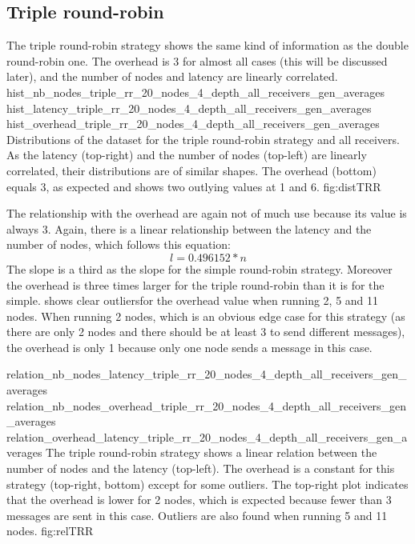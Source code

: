 \FloatBarrier
\subsection{Triple round-robin}
The triple round-robin strategy shows  the same kind of information as the
double round-robin one. The overhead is 3 for almost all cases (this will be
discussed later), and the number of nodes and latency are linearly correlated.
\triplefigure
    {hist_nb_nodes_triple_rr_20_nodes_4_depth_all_receivers_gen_averages}
    {hist_latency_triple_rr_20_nodes_4_depth_all_receivers_gen_averages}
    {hist_overhead_triple_rr_20_nodes_4_depth_all_receivers_gen_averages}
    {Distributions of the dataset for the triple round-robin strategy and all
    receivers. As the latency (top-right) and the number of nodes (top-left) are
    linearly correlated, their distributions are of similar shapes. The
    overhead (bottom) equals 3, as expected and shows two outlying values at 1
    and 6.}
    {fig:distTRR}

The relationship with the overhead are again not of much use because its value
is always 3. Again, there is a linear relationship between the latency and the
number of nodes, which follows this equation:
    \[l = 0.496152 * n\]
The slope is a third as the slope for the simple round-robin strategy. Moreover
the overhead is three times larger for the triple round-robin than it is for the
simple.
 shows clear outliersfor the overhead value when running
2, 5 and 11 nodes. When running 2 nodes, which is an obvious edge case for this
strategy (as there are only 2 nodes and there should be at least 3 to send
different messages), the overhead is only 1 because only one node sends a
message in this case. 

\triplefigure
    {relation_nb_nodes_latency_triple_rr_20_nodes_4_depth_all_receivers_gen_averages}
    {relation_nb_nodes_overhead_triple_rr_20_nodes_4_depth_all_receivers_gen_averages}
    {relation_overhead_latency_triple_rr_20_nodes_4_depth_all_receivers_gen_averages}
    {The triple round-robin strategy shows a linear relation between the number of
    nodes and the latency (top-left). The overhead is a constant for this
    strategy (top-right, bottom) except for some outliers. The top-right plot
    indicates that the overhead is lower for 2 nodes, which is expected because
    fewer than 3 messages are sent in this case. Outliers are also found when
    running 5 and 11 nodes.}
    {fig:relTRR}


